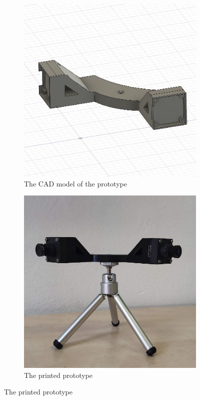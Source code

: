 \begin{figure}[h]
  \begin{subfigure}[b]{0.49\textwidth}
    \centering
    \includegraphics[width=\textwidth]{graphics/CAD.jpg}
    \caption{The CAD model of the prototype}
    \label{fig:proto_scheme}
  \end{subfigure}
  \hfill
  \begin{subfigure}[b]{0.49\textwidth}
    \centering
    \includegraphics[width=\textwidth]{graphics/prototype.jpg}
    \caption{The printed prototype}
    \label{fig:proto_printed}
  \end{subfigure}
  \label{The proposed sollution prototype}
\end{figure}

